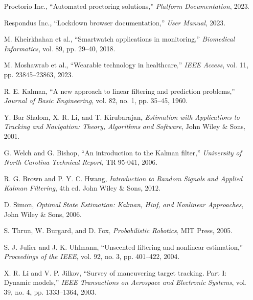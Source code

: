 \documentclass[conference]{IEEEtran}
\begin{document}
\begin{thebibliography}{99}
Proctorio Inc., ``Automated proctoring solutions,'' \textit{Platform Documentation}, 2023.

Respondus Inc., ``Lockdown browser documentation,'' \textit{User Manual}, 2023.

M. Kheirkhahan et al., ``Smartwatch applications in monitoring,'' \textit{Biomedical Informatics}, vol. 89, pp. 29--40, 2018.

M. Moshawrab et al., ``Wearable technology in healthcare,'' \textit{IEEE Access}, vol. 11, pp. 23845--23863, 2023.

R. E. Kalman, ``A new approach to linear filtering and prediction problems,'' \textit{Journal of Basic Engineering}, vol. 82, no. 1, pp. 35--45, 1960.

Y. Bar-Shalom, X. R. Li, and T. Kirubarajan, \textit{Estimation with Applications to Tracking and Navigation: Theory, Algorithms and Software}, John Wiley \& Sons, 2001.

G. Welch and G. Bishop, ``An introduction to the Kalman filter,'' \textit{University of North Carolina Technical Report}, TR 95-041, 2006.

R. G. Brown and P. Y. C. Hwang, \textit{Introduction to Random Signals and Applied Kalman Filtering}, 4th ed. John Wiley \& Sons, 2012.

D. Simon, \textit{Optimal State Estimation: Kalman, Hinf, and Nonlinear Approaches}, John Wiley \& Sons, 2006.

S. Thrun, W. Burgard, and D. Fox, \textit{Probabilistic Robotics}, MIT Press, 2005.

S. J. Julier and J. K. Uhlmann, ``Unscented filtering and nonlinear estimation,'' \textit{Proceedings of the IEEE}, vol. 92, no. 3, pp. 401--422, 2004.

X. R. Li and V. P. Jilkov, ``Survey of maneuvering target tracking. Part I: Dynamic models,'' \textit{IEEE Transactions on Aerospace and Electronic Systems}, vol. 39, no. 4, pp. 1333--1364, 2003.

\end{thebibliography}
\end{document}
